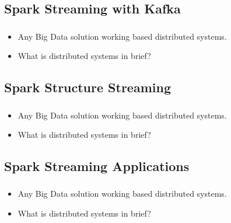 
\subsection{Spark Streaming with Kafka}

\begin{frame}
  \frametitle{\subsecname}
	\begin{itemize}[<+->]
		\item Any Big Data solution working based distributed systems.
		\item What is distributed systems in brief?
	\end{itemize}
\end{frame}



\subsection{Spark Structure Streaming}

\begin{frame}
  \frametitle{\subsecname}
	\begin{itemize}[<+->]
		\item Any Big Data solution working based distributed systems.
		\item What is distributed systems in brief?
	\end{itemize}
\end{frame}



\subsection{Spark Streaming Applications}

\begin{frame}
  \frametitle{\subsecname}
	\begin{itemize}[<+->]
		\item Any Big Data solution working based distributed systems.
		\item What is distributed systems in brief?
	\end{itemize}
\end{frame}

